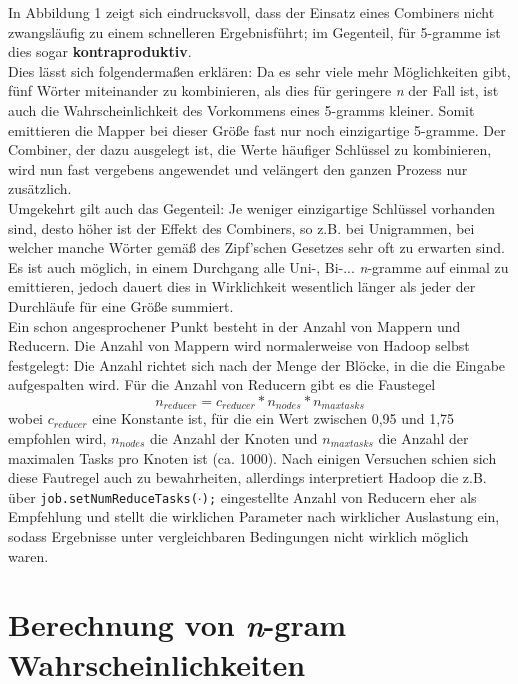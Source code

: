 \documentclass[a4paper,12pt]{scrartcl}
\begin{document}
    In Abbildung 1 zeigt sich eindrucksvoll, dass der Einsatz eines Combiners nicht zwangsläufig zu einem schnelleren Ergebnisführt; im Gegenteil, für 5-gramme ist dies sogar \textbf{kontraproduktiv}.\\

    Dies lässt sich folgendermaßen erklären: Da es sehr viele mehr Möglichkeiten gibt, fünf Wörter miteinander zu kombinieren, als dies für geringere \emph{n} der Fall ist, ist auch die Wahrscheinlichkeit des Vorkommens eines 5-gramms kleiner. Somit emittieren die Mapper bei dieser Größe fast nur noch einzigartige 5-gramme. Der Combiner, der dazu ausgelegt ist, die Werte häufiger Schlüssel zu kombinieren, wird nun fast vergebens angewendet und velängert den ganzen Prozess nur zusätzlich. \\

    Umgekehrt gilt auch das Gegenteil: Je weniger einzigartige Schlüssel vorhanden sind, desto höher ist der Effekt des Combiners, so z.B. bei Unigrammen, bei welcher manche Wörter gemäß des Zipf'schen Gesetzes sehr oft zu erwarten sind. \\

    Es ist auch möglich, in einem Durchgang alle Uni-, Bi-... \emph{n}-gramme auf einmal zu emittieren, jedoch dauert dies in Wirklichkeit wesentlich länger als jeder der Durchläufe für eine Größe summiert. \\

    Ein schon angesprochener Punkt besteht in der Anzahl von Mappern und Reducern. Die Anzahl von Mappern wird normalerweise von Hadoop selbst festgelegt: Die Anzahl richtet sich nach der Menge der Blöcke, in die die Eingabe aufgespalten wird. Für die Anzahl von Reducern gibt es die Faustegel
    \[n_{reducer} = c_{reducer} * n_{nodes} * n_{max tasks}\]
    wobei $c_{reducer}$ eine Konstante ist, für die ein Wert zwischen 0,95 und 1,75 empfohlen wird, $n_{nodes}$ die Anzahl der Knoten und $n_{max tasks}$ die Anzahl der maximalen Tasks pro Knoten ist (ca. 1000)\cite{hadoop}. Nach einigen Versuchen schien sich diese Fautregel auch zu bewahrheiten, allerdings interpretiert Hadoop die z.B. über {\tt job.setNumReduceTasks($\cdot$);} eingestellte Anzahl von Reducern eher als Empfehlung und stellt die wirklichen Parameter nach wirklicher Auslastung ein, sodass Ergebnisse unter vergleichbaren Bedingungen nicht wirklich möglich waren.

\section{Berechnung von \emph{n}-gram Wahrscheinlichkeiten}
\end{document}
